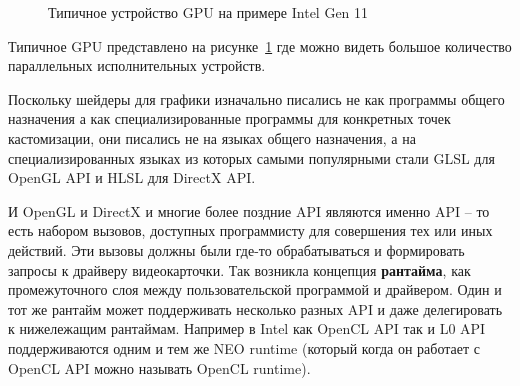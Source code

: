 \begin{figure}[ht]
    \caption{Типичное устройство GPU на примере Intel Gen 11}\label{fig:typicalGPU}
\end{figure}

Типичное GPU представлено на рисунке~\cref{fig:typicalGPU} где можно видеть большое количество параллельных исполнительных устройств.

Поскольку шейдеры для графики изначально писались не как программы общего назначения а как специализированные программы для конкретных точек кастомизации, они писались не на языках общего назначения, а на специализированных языках из которых самыми популярными стали GLSL для OpenGL API и HLSL для DirectX API.

И OpenGL и DirectX и многие более поздние API являются именно API -- то есть набором вызовов, доступных программисту для совершения тех или иных действий. Эти вызовы должны были где-то обрабатываться и формировать запросы к драйверу видеокарточки. Так возникла концепция \textbf{рантайма}, как промежуточного слоя между пользовательской программой и драйвером. Один и тот же рантайм может поддерживать несколько разных API и даже делегировать к нижележащим рантаймам. Например в Intel как OpenCL API так и L0 API поддерживаются одним и тем же NEO runtime (который когда он работает с OpenCL API можно называть OpenCL runtime).

